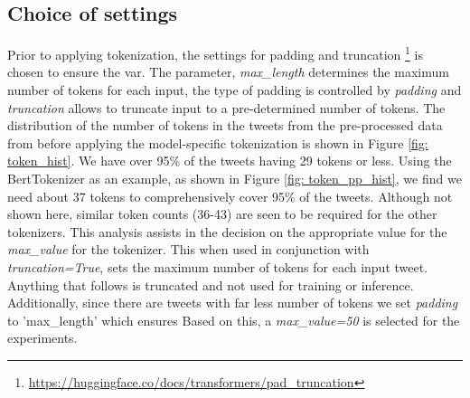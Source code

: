 \subsection{Choice of settings}
Prior to applying tokenization, the settings for padding and truncation \footnote{\url{https://huggingface.co/docs/transformers/pad_truncation}} is chosen to ensure the var. The parameter, \textit{max\_length} determines the maximum number of tokens for each input, the type of padding is controlled by \textit{padding} and \textit{truncation} allows to truncate input to a pre-determined number of tokens. 
\newline\newline
The distribution of the number of tokens in the tweets from the pre-processed data from \cite{jinModelingSeverityComplaints2021} before applying the model-specific tokenization is shown in Figure \ref{fig: token_hist}. We have over 95\% of the tweets having 29 tokens or less. Using the BertTokenizer as an example, as shown in Figure \ref{fig: token_pp_hist}, we find we need about 37 tokens to comprehensively cover 95\% of the tweets. Although not shown here, similar token counts (36-43) are seen to be required for the other tokenizers. This analysis assists in the decision on the appropriate value for the \textit{max\_value} for the tokenizer. This when used in conjunction with \textit{truncation=True}, sets the maximum number of tokens for each input tweet. Anything that follows is truncated and not used for training or inference. Additionally, since there are tweets with far less number of tokens we set \textit{padding} to 'max_length' which ensures Based on this, a \textit{max\_value=50} is selected for the experiments.

